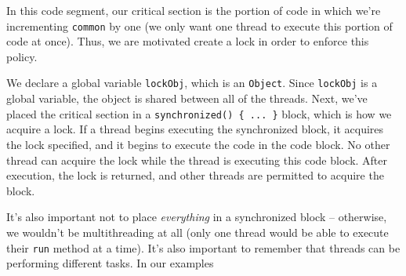In this code segment, our critical section is the portion of code in which we're incrementing \verb!common! by one (we only want one thread to execute this portion of code at once). Thus, we are motivated create a lock in order to enforce this policy.

We declare a global variable \verb!lockObj!, which is an \verb!Object!. Since \verb!lockObj! is a global variable, the object is shared between all of the threads. Next, we've placed the critical section in a \verb!synchronized() { ... }! block, which is how we acquire a lock. If a thread begins executing the synchronized block, it acquires the lock specified, and it begins to execute the code in the code block. No other thread can acquire the lock while the thread is executing this code block. After execution, the lock is returned, and other threads are permitted to acquire the block.

It's also important not to place \textit{everything} in a synchronized block -- otherwise, we wouldn't be multithreading at all (only one thread would be able to execute their \verb!run! method at a time). It's also important to remember that threads can be performing different tasks. In our examples